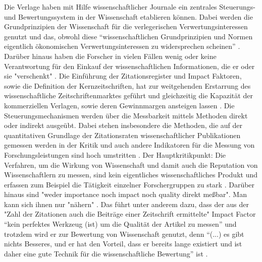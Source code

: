 Die Verlage haben mit Hilfe wissenschaftlicher Journale ein zentrales Steuerungs- und Bewertungssystem in der Wissenschaft etablieren können. Dabei werden die Grundprinzipien der Wissenschaft für die verlegerischen Verwertungsinteressen genutzt und das, obwohl diese “wissenschaftlichen Grundprinzipien und Normen eigentlich ökonomischen Verwertungsinteressen zu widersprechen scheinen” \cite{hanekop_2006}. Darüber hinaus haben die Forscher in vielen Fällen wenig oder keine Verantwortung für den Einkauf der wissenschaftlichen Informationen, die er oder sie "verschenkt" \cite{steele_2006}. Die Einführung der Zitationsregister und Impact Faktoren, sowie die Definition der Kernzeitschriften, hat zur weitgehenden Erstarrung des wissenschaftliche Zeitschriftenmarktes geführt und gleichzeitig die Kapazität der kommerziellen Verlagen, sowie deren Gewinnmargen ansteigen lassen \cite{CREATe_2014}. Die Steuerungsmechanismen werden über die Messbarkeit mittels Methoden direkt oder indirekt ausgeübt. Dabei stehen insbesondere die Methoden, die auf der quantitativen Grundlage der Zitationsraten wissenschaftlicher Publikationen gemessen werden in der Kritik \cite{Dong_2005} und auch andere Indikatoren für die Messung von Forschungsleistungen sind hoch umstritten \cite{Hornbostel_1997} \cite{Hicks_1996} \cite{Havemann_2002}. Der Hauptkritikpunkt: Die Verfahren, um die Wirkung von Wissenschaft und damit auch die Reputation von Wissenschaftlern zu messen, sind kein eigentliches wissenschaftliches Produkt\cite{suchen} und erfassen zum Beispiel die Tätigkeit einzelner Forschergruppen zu stark \cite{schmoch_2009}. Darüber hinaus sind "weder importance noch impact noch quality direkt meßbar". Man kann sich ihnen nur "nähern" \cite{Hornbostel_1997}. Das führt unter anderem dazu, dass der aus der "Zahl der Zitationen auch die Beiträge einer Zeitschrift ermittelte" \cite{weishaupt_2009_goldenOA} Impact Factor “kein perfektes Werkzeug (ist) um die Qualität der Artikel zu messen” und trotzdem wird er zur Bewertung von Wissenschaft genutzt, denn “(...) es gibt nichts Besseres, und er hat den Vorteil, dass er bereits lange existiert und ist daher eine gute Technik für die wissenschaftliche Bewertung” ist \cite{garfield_1999} \cite{weishaupt_2009_goldenOA}. 

